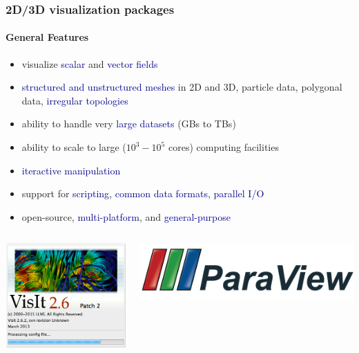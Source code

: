 \begin{frame}
\frametitle{2D/3D visualization packages}
\framesubtitle{General Features}

\begin{itemize}
        \item visualize \textcolor{DarkBlue}{scalar} and \textcolor{DarkBlue}{vector fields}
        \item \textcolor{DarkBlue}{structured and unstructured meshes} in 2D and 3D, particle data, polygonal
data, \textcolor{DarkBlue}{irregular topologies}
        \item ability to handle very \textcolor{DarkBlue}{large datasets} (GBs to TBs)
        \item ability to scale to large ($10^3 - 10^5$ cores) computing facilities
        \item \textcolor{DarkBlue}{iteractive manipulation}
        \item support for \textcolor{DarkBlue}{scripting}, \textcolor{DarkBlue}{common data formats}, \textcolor{DarkBlue}{parallel I/O}
        \item open-source, \textcolor{DarkBlue}{multi-platform}, and \textcolor{DarkBlue}{general-purpose}
\end{itemize}

    \begin{columns} %
    \begin{column}{5.5cm}
        \centering
        \href{https://wci.llnl.gov/simulation/computer-codes/visit/}{\includegraphics[width=.75\columnwidth, clip=true,trim=0 2cm 0 0]{./figs/visit-logos//VisIt26}}
    \end{column}
    \begin{column}{5.5cm}
        \centering
        \href{http://www.paraview.org}{\includegraphics[width=.7\columnwidth]{./figs/visit-logos//ParaViewLogo}}
    \end{column}
    \end{columns}

\end{frame}



